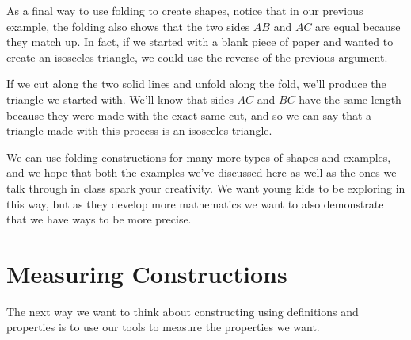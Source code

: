 \documentclass{ximera}
\begin{document}
As a final way to use folding to create shapes, notice that in our previous example, the folding also shows that the two sides $AB$ and $AC$ are equal because they match up. In fact, if we started with a blank piece of paper and wanted to create an isosceles triangle, we could use the reverse of the previous argument.
\begin{center}
\end{center}
If we cut along the two solid lines and unfold along the fold, we'll produce the triangle we started with. We'll know that sides $AC$ and $BC$ have the same length because they were made with the exact same cut, and so we can say that a triangle made with this process is an isosceles triangle.

We can use folding constructions for many more types of shapes and examples, and we hope that both the examples we've discussed here as well as the ones we talk through in class spark your creativity. We want young kids to be exploring in this way, but as they develop more mathematics we want to also demonstrate that we have ways to be more precise.

\section{Measuring Constructions}
The next way we want to think about constructing using definitions and properties is to use our tools to measure the properties we want.
\end{document}
